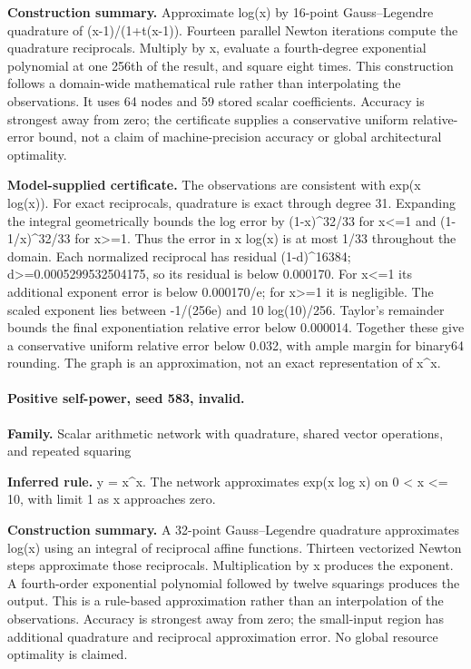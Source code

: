 \textbf{Construction summary.} Approximate log(x) by 16-point Gauss--Legendre quadrature of (x-1)/(1+t(x-1)). Fourteen parallel Newton iterations compute the quadrature reciprocals. Multiply by x, evaluate a fourth-degree exponential polynomial at one 256th of the result, and square eight times. This construction follows a domain-wide mathematical rule rather than interpolating the observations. It uses 64 nodes and 59 stored scalar coefficients. Accuracy is strongest away from zero; the certificate supplies a conservative uniform relative-error bound, not a claim of machine-precision accuracy or global architectural optimality.


\textbf{Model-supplied certificate.} The observations are consistent with exp(x log(x)). For exact reciprocals, quadrature is exact through degree 31. Expanding the integral geometrically bounds the log error by (1-x)\textasciicircum{}32/33 for x<=1 and (1-1/x)\textasciicircum{}32/33 for x>=1. Thus the error in x log(x) is at most 1/33 throughout the domain. Each normalized reciprocal has residual (1-d)\textasciicircum{}16384; d>=0.0005299532504175, so its residual is below 0.000170. For x<=1 its additional exponent error is below 0.000170/e; for x>=1 it is negligible. The scaled exponent lies between -1/(256e) and 10 log(10)/256. Taylor's remainder bounds the final exponentiation relative error below 0.000014. Together these give a conservative uniform relative error below 0.032, with ample margin for binary64 rounding. The graph is an approximation, not an exact representation of x\textasciicircum{}x.


\paragraph{Positive self-power, seed 583, invalid.}

\textbf{Family.} Scalar arithmetic network with quadrature, shared vector operations, and repeated squaring


\textbf{Inferred rule.} y = x\textasciicircum{}x. The network approximates exp(x log x) on 0 < x <= 10, with limit 1 as x approaches zero.


\textbf{Construction summary.} A 32-point Gauss--Legendre quadrature approximates log(x) using an integral of reciprocal affine functions. Thirteen vectorized Newton steps approximate those reciprocals. Multiplication by x produces the exponent. A fourth-order exponential polynomial followed by twelve squarings produces the output. This is a rule-based approximation rather than an interpolation of the observations. Accuracy is strongest away from zero; the small-input region has additional quadrature and reciprocal approximation error. No global resource optimality is claimed.


